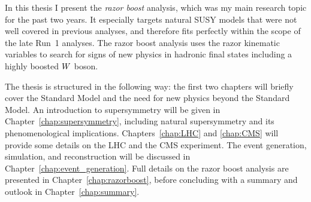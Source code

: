 In this thesis I present the \textit{razor boost} analysis, which was my main research topic for the
past two years. It especially targets natural SUSY models that were not well covered in previous
analyses, and therefore fits perfectly within the scope of the late Run~1 analyses. The razor boost
analysis uses the razor kinematic variables to search for signs of new physics in hadronic final
states including a highly boosted $W$ boson. 

The thesis is structured in the following way: the first two chapters will briefly cover the
Standard Model and the need for new physics beyond the Standard Model. An introduction to
supersymmetry will be given in Chapter~\ref{chap:supersymmetry}, including natural
supersymmetry and its phenomenological implications. Chapters~\ref{chap:LHC} and \ref{chap:CMS} will
provide some details on the LHC and the CMS experiment. The event generation, simulation, and
reconstruction will be discussed in Chapter~\ref{chap:event_generation}. Full details on the razor
boost analysis are presented in Chapter~\ref{chap:razorboost}, before concluding with a summary and
outlook in Chapter~\ref{chap:summary}.



